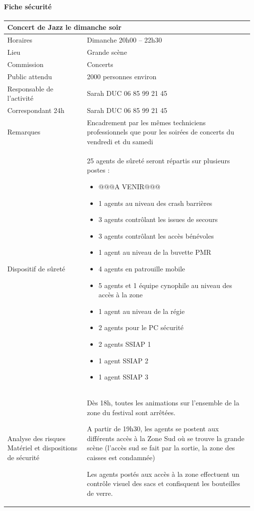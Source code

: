 \documentclass[hidelinks, paper=a4, fontsize=13pt]{report}
\begin{document}
\newpage
\paragraph{Fiche sécurité}
\begin{center}
\begin{tabular}{ | p{6cm} | p{10cm} | }
\hline
	\multicolumn{2}{|l|}{Concert de Jazz le dimanche soir } \\ \hline
	Horaires & Dimanche  20h00 – 22h30 \\ \hline
	Lieu & Grande scène \\ \hline
	Commission & Concerts \\ \hline
	Public attendu & 2000 personnes environ \\ \hline
	Responsable de l'activité & Sarah DUC 06 85 99 21 45\\ \hline
	Correspondant 24h & Sarah DUC 06 85 99 21 45\\ \hline
	Remarques & Encadrement par les mêmes techniciens professionnels que pour les soirées de concerts du vendredi et du samedi \\ \hline
	Dispositif de sûreté & 25 agents de sûreté seront répartis sur plusieurs postes :
	\begin{itemize}
	\item @@@A VENIR@@@	
	\item 1 agents au niveau des crash barrières
	\item 3 agents contrôlant les issues de secours
	\item 3 agents contrôlant les accès bénévoles
	\item 1 agent au niveau de la buvette PMR
	\item 4 agents en patrouille mobile
	\item 5 agents et 1 équipe cynophile au niveau des accès à la zone
	\item 1 agent au niveau de la régie
	\item 2 agents pour le PC sécurité
	\item 2 agents SSIAP 1
	\item 1 agent SSIAP 2
	\item 1 agent SSIAP 3
	\end{itemize}
 \\ \hline
Analyse des risques
Matériel et dispositions de sécurité & Dès 18h, toutes les animations sur l’ensemble de la zone du festival sont arrêtées. 

A partir de 19h30, les agents se postent aux différents accès à la Zone Sud où se trouve la grande scène (l’accès sud se fait par la sortie, la zone des caisses est condamnée) 

Les agents postés aux accès à la zone effectuent un contrôle visuel des sacs et confisquent les bouteilles de verre. 
 \\ \hline
\end{tabular}

\end{center}
\end{document}
